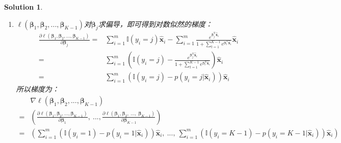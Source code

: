 \documentclass[a4paper,UTF8]{article}
\numberwithin{equation}{section}
\newtheorem*{solution}{Solution}
\begin{document}
\begin{solution}
\begin{enumerate}
\begin{equation}
\begin{aligned}
=& \sum_{i=1}^{m}\sum_{j=1}^{K-1}\mathbb{I}(y_i=j)(\boldsymbol{\beta}_j^\mathrm{T}\hat{\mathbf{x}}_i- \ln (1 + \sum_{t=1}^{K-1}e^{\boldsymbol{\beta}_t^\mathrm{T}\hat{\mathbf{x}}_i})) - \sum_{i=1}^{m}\mathbb{I}(y_i=K)\ln(1 + \sum_{t=1}^{K-1}e^{\boldsymbol{\beta}_t^\mathrm{T}\hat{\mathbf{x}}_i})\\
=&\sum_{i=1}^{m}\sum_{j=1}^{K-1}\mathbb{I}(y_i=j)(\boldsymbol{\beta}_j^\mathrm{T}\hat{\mathbf{x}}_i) - \sum_{i=1}^{m}\ln(1 + \sum_{t=1}^{K-1}e^{\boldsymbol{\beta}_t^\mathrm{T}\hat{\mathbf{x}}_i})
\end{aligned}
\end{equation}
综上所述
\begin{equation}
\ell(\boldsymbol{\beta}_1, \boldsymbol{\beta}_2,...,\boldsymbol{\beta}_{K-1}) = \sum_{i=1}^{m}\sum_{j=1}^{K-1}\mathbb{I}(y_i=j)(\boldsymbol{\beta}_j^\mathrm{T}\hat{\mathbf{x}}_i) - \sum_{i=1}^{m}\ln(1 + \sum_{t=1}^{K-1}e^{\boldsymbol{\beta}_t^\mathrm{T}\hat{\mathbf{x}}_i})
\end{equation}

\item
$\ell(\boldsymbol{\beta}_1, \boldsymbol{\beta}_2,...,\boldsymbol{\beta}_{K-1})$对$\boldsymbol{\beta}_j$求偏导，即可得到对数似然的梯度：
\begin{equation}
\begin{aligned}
\frac{\partial\ell(\boldsymbol{\beta}_1, \boldsymbol{\beta}_2,...,\boldsymbol{\beta}_{K-1})}{\partial\boldsymbol{\beta}_j} 
=& \sum_{i=1}^{m}\mathbb{I}(y_i=j)\hat{\mathbf{x}}_i - \sum_{i=1}^{m}\frac{e^{\boldsymbol{\beta}_j^\mathrm{T}\hat{\mathbf{x}}_i}}{1 + \sum_{t=1}^{K-1}e^{\boldsymbol{\beta}_t^\mathrm{T}\hat{\mathbf{x}}_i}}\hat{\mathbf{x}}_i\\
=& \sum_{i=1}^{m}(\mathbb{I}(y_i=j) - \frac{e^{\boldsymbol{\beta}_j^\mathrm{T}\hat{\mathbf{x}}_i}}{1 + \sum_{t=1}^{K-1}e^{\boldsymbol{\beta}_t^\mathrm{T}\hat{\mathbf{x}}_i}})\hat{\mathbf{x}}_i\\
=& \sum_{i=1}^{m}(\mathbb{I}(y_i=j) - 	p(y_i=j|\hat{\mathbf{x}}_i))\hat{\mathbf{x}}_i
\end{aligned}
\end{equation} 
所以梯度为：
\begin{equation}
\begin{aligned}
&\nabla \ell(\boldsymbol{\beta}_1, \boldsymbol{\beta}_2,...,\boldsymbol{\beta}_{K-1})\\
=&\left(\frac{\partial\ell(\boldsymbol{\beta}_1, \boldsymbol{\beta}_2,...,\boldsymbol{\beta}_{K-1})}{\partial\boldsymbol{\beta}_1},\ ...,\frac{\partial\ell(\boldsymbol{\beta}_1, \boldsymbol{\beta}_2,\ ...,\  \boldsymbol{\beta}_{K-1})}{\partial\boldsymbol{\beta}_{K-1}}\right)\\
=& \left(\sum_{i=1}^{m}(\mathbb{I}(y_i=1) - 	p(y_i=1|\hat{\mathbf{x}}_i))\hat{\mathbf{x}}_i,\ ...,\ \sum_{i=1}^{m}(\mathbb{I}(y_i=K-1) - 	p(y_i=K-1|\hat{\mathbf{x}}_i))\hat{\mathbf{x}}_i\right)
\end{aligned}
\end{equation}
\end{enumerate}	
	
\end{solution}
\newpage
\end{document}
